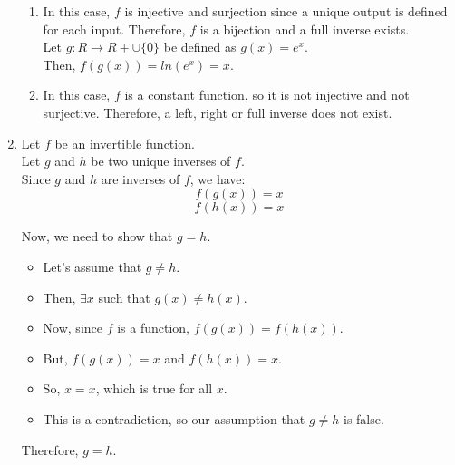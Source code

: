 \documentclass[a4paper]{article}
\begin{document}
\begin{enumerate}
\begin{enumerate}
            \item In this case, $f$ is injective and surjection since a unique output is defined for each input. Therefore, $f$ is a bijection and a full inverse exists.\\

            Let $g: R \rightarrow R + \cup \{0\}$ be defined as $g(x) = e^x$.\\
            Then, $f(g(x)) = ln(e^x) = x$.\\

            \item In this case, $f$ is a constant function, so it is not injective and not surjective. Therefore, a left, right or full inverse does not exist.\\
        \end{enumerate}


        \item Let $f$ be an invertible function.\\
        Let $g$ and $h$ be two unique inverses of $f$.\\

        Since $g$ and $h$ are inverses of $f$, we have:
        \[f(g(x)) = x\]
        \[f(h(x)) = x\]

        Now, we need to show that $g = h$.\\
        \begin{itemize}
            \item Let's assume that $g \neq h$.\\
            \item Then, $\exists x$ such that $g(x) \neq h(x)$.\\
            \item Now, since $f$ is a function, $f(g(x)) = f(h(x))$.\\
            \item But, $f(g(x)) = x$ and $f(h(x)) = x$.\\
            \item So, $x = x$, which is true for all $x$.\\
            \item This is a contradiction, so our assumption that $g \neq h$ is false.\\
        \end{itemize}

    Therefore, $g = h$.\\
    
    \end{enumerate}
\end{document}
